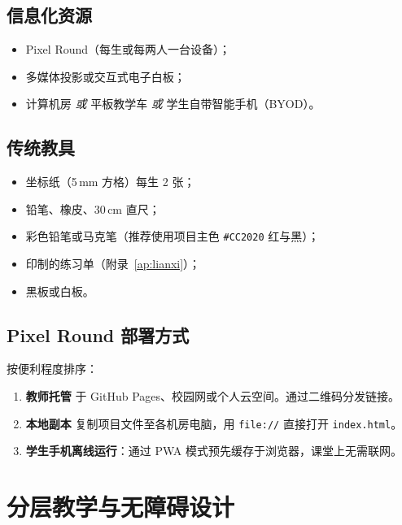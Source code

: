 \documentclass[12pt,a4paper]{scrartcl}
\begin{document}
\subsection{信息化资源}
\begin{itemize}[leftmargin=1.3em,itemsep=0.15em,topsep=0.3em]
  \item Pixel Round（每生或每两人一台设备）；
  \item 多媒体投影或交互式电子白板；
  \item 计算机房 \emph{或} 平板教学车 \emph{或} 学生自带智能手机（BYOD）。
\end{itemize}

\subsection{传统教具}
\begin{itemize}[leftmargin=1.3em,itemsep=0.15em,topsep=0.3em]
  \item 坐标纸（5\,mm 方格）每生 2 张；
  \item 铅笔、橡皮、30\,cm 直尺；
  \item 彩色铅笔或马克笔（推荐使用项目主色 \texttt{\#CC2020} 红与黑）；
  \item 印制的练习单（附录~\ref{ap:lianxi}）；
  \item 黑板或白板。
\end{itemize}

\subsection{Pixel Round 部署方式}

按便利程度排序：

\begin{enumerate}[leftmargin=1.5em,itemsep=0.15em,topsep=0.3em]
  \item \textbf{教师托管} 于 GitHub Pages、校园网或个人云空间。通过二维码分发链接。
  \item \textbf{本地副本} 复制项目文件至各机房电脑，用 \texttt{file://} 直接打开 \texttt{index.html}。
  \item \textbf{学生手机离线运行}：通过 PWA 模式预先缓存于浏览器，课堂上无需联网。
\end{enumerate}

\section{分层教学与无障碍设计}\label{sec:fenceng}
\end{document}
